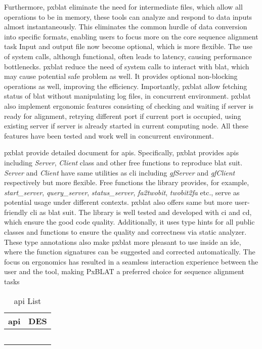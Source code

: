 Furthermore, \gls{pxblat} eliminate the need for intermediate files, which allow all operations to be in memory, these tools can analyze and respond to data inputs almost instantaneously.
This eliminates the common hurdle of data conversion into specific formats, enabling users to focus more on the core sequence alignment task
Input and output file now become optional, which is more flexible.
The use of system calls, although functional, often leads to latency, causing performance bottlenecks.
\gls{pxblat} reduce the need of system calls to interact with \gls{blat}, which may cause potential safe problem as well.
It provides optional non-blocking operations as well, improving the efficiency.
Importantly, \gls{pxblat} allow fetching status of \gls{blat} without manipulating log files, in concurrent environment.
\gls{pxblat} also implement ergonomic features consisting of checking and waiting if server is ready for alignment, retrying different port if current port is occupied, using existing server if server is already started in current computing node.
All these features have been tested and work well in concurrent environment.

\gls{pxblat} provide detailed document for \glspl{api}.
Specifically, \gls{pxblat} provides \glspl{api} including  \emph{Server}, \emph{Client} class and other free functions to reproduce \gls{blat} suit.
\emph{Server} and \emph{Client} have same utilities as \gls{cli} including \emph{gfServer} and \emph{gfClient} respectively but more flexible.
Free functions the library provides, for example, \emph{start\_server}, \emph{query\_server}, \emph{status\_server}, \emph{fa2twobit}, \emph{twobit2fa} etc., serve as potential usage under different contexts.
\gls{pxblat} also offers same but more user-friendly \gls{cli} as \gls{blat} suit.
The library is well tested and developed with \gls{ci} and \gls{cd}, which ensure the good code quality.
Additionally, it uses type hints for all public classes and functions to ensure the quality and correctness via static analyzer.
These type annotations also make \gls{pxblat} more pleasant to use inside an \gls{ide}, where the function signatures can be suggested and corrected automatically.
The focus on ergonomics has resulted in a seamless interaction experience between the user and the tool, making PxBLAT a preferred choice for sequence alignment tasks


\begin{table}[]
	\caption{\gls{api} List}
	\label{tab:api}
	\centering
	\begin{tabular}{@{}ll@{}}
		\toprule
		\gls{api} & DES \\ \midrule
		          &     \\
		          &     \\
		          &     \\
		          &     \\
		          &     \\ \bottomrule
	\end{tabular}
\end{table}


